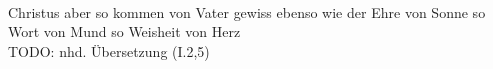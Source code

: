 \begin{exe}
\ex \label{ex:I683} \gll {}                       \\
{Christus} {aber} {so} {kommen} {von} {Vater} {gewiss} {ebenso wie} {der} {Ehre} {von} {Sonne} {} {so} {Wort} {von} {Mund} {} {so} {Weisheit} {von} {Herz} {}\\
\glt TODO: nhd. Übersetzung (I.2,5)
\end{exe}
